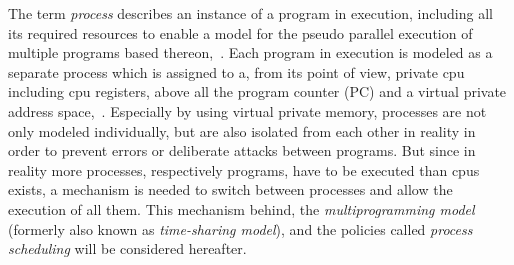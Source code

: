 %
%
%


The term \textit{process} describes an instance of a program in execution, including all its required resources to enable a model for the pseudo parallel execution of multiple programs based thereon\cite{silberschatz2009operating},~\cite{tanenbaum-modern-operating-systems}.
Each program in execution is modeled as a separate process which is assigned to a, from its point of view, private \ac{cpu} including \ac{cpu} registers, above all the program counter (PC) and a virtual private address space\cite{tanenbaum-modern-operating-systems},~\cite{glatz2015betriebssysteme}.
Especially by using virtual private memory, processes are not only modeled individually, but are also isolated from each other in reality in order to prevent errors or deliberate attacks between programs\cite{brause2017betriebssysteme}.
But since in reality more processes, respectively programs, have to be executed than \acp{cpu} exists, a mechanism is needed to switch between processes and allow the execution of all them.
This mechanism behind, the \textit{multiprogramming model} (formerly also known as \textit{time-sharing model}), and the policies called \textit{process scheduling} will be considered hereafter.

